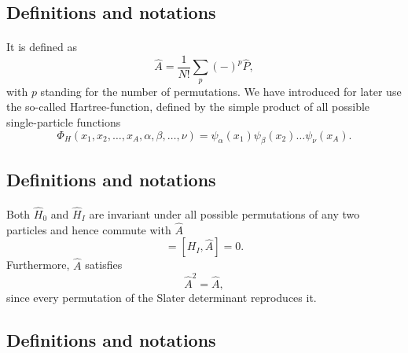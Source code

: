 \documentclass[%
twoside,                 %
final,                   %
10pt]{article}
\begin{document}
\subsection*{Definitions and notations}

\paragraph{}
It is defined as
\begin{equation}
  \hat{A} = \frac{1}{N!}\sum_{p} (-)^p\hat{P},
\label{antiSymmetryOperator}
\end{equation}
with $p$ standing for the number of permutations. We have introduced for later use the so-called
Hartree-function, defined by the simple product of all possible single-particle functions
\[
  \Phi_H(x_1,x_2,\dots,x_A,\alpha,\beta,\dots,\nu) =
  \psi_{\alpha}(x_1)
    \psi_{\beta}(x_2)\dots\psi_{\nu}(x_A).
\]



\subsection*{Definitions and notations}

\paragraph{}
Both $\hat{H}_0$ and $\hat{H}_I$ are invariant under all possible permutations of any two particles
and hence commute with $\hat{A}$
\begin{equation}
  [H_0,\hat{A}] = [H_I,\hat{A}] = 0. \label{commutionAntiSym}
\end{equation}
Furthermore, $\hat{A}$ satisfies
\begin{equation}
  \hat{A}^2 = \hat{A},  \label{AntiSymSquared}
\end{equation}
since every permutation of the Slater
determinant reproduces it.



\subsection*{Definitions and notations}

\end{document}
